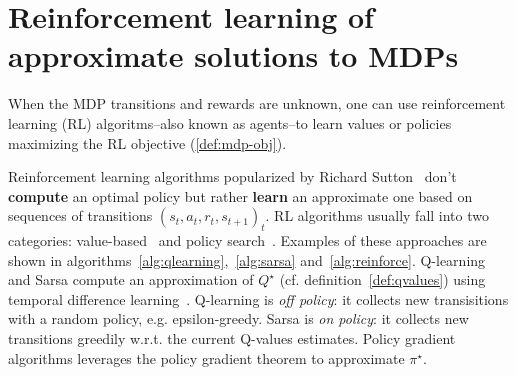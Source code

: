 \section{Reinforcement learning of approximate solutions to MDPs}\label{sec:rl}
When the MDP transitions and rewards are unknown, one can use reinforcement learning (RL) algoritms--also known as agents--to learn values or policies maximizing the RL objective (\ref{def:mdp-obj}). 

Reinforcement learning algorithms popularized by Richard Sutton~\cite{sutton} don't \textbf{compute} an optimal policy but rather \textbf{learn} an approximate one based on sequences of transitions $(s_t, a_t, r_t, s_{t+1})_t$.
RL algorithms usually fall into two categories: value-based~\cite{sutton} and policy search~\cite{pg_sutton}.
Examples of these approaches are shown in algorithms~\ref{alg:qlearning},~\ref{alg:sarsa} and~\ref{alg:reinforce}.
Q-learning and Sarsa compute an approximation of $Q^{\star}$ (cf. definition~\ref{def:qvalues}) using temporal difference learning~\cite{sutton}. Q-learning is \textit{off policy}: it collects new transisitions with a random policy, e.g. epsilon-greedy. Sarsa is \textit{on policy}: it collects new transitions greedily w.r.t. the current Q-values estimates.
Policy gradient algorithms leverages the policy gradient theorem to approximate $\pi^{\star}$.

